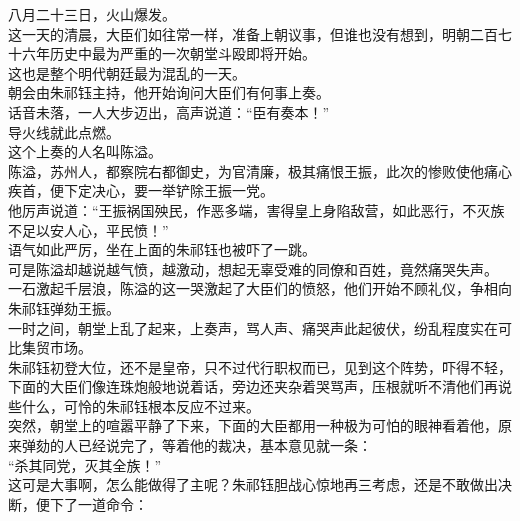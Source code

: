 \begin{multicols}{\theparacolNo}
八月二十三日，火山爆发。\\

这一天的清晨，大臣们如往常一样，准备上朝议事，但谁也没有想到，明朝二百七十六年历史中最为严重的一次朝堂斗殴即将开始。\\

这也是整个明代朝廷最为混乱的一天。\\

朝会由朱祁钰主持，他开始询问大臣们有何事上奏。\\

话音未落，一人大步迈出，高声说道：“臣有奏本！”\\

导火线就此点燃。\\

这个上奏的人名叫陈溢。\\

陈溢，苏州人，都察院右都御史，为官清廉，极其痛恨王振，此次的惨败使他痛心疾首，便下定决心，要一举铲除王振一党。\\

他厉声说道：“王振祸国殃民，作恶多端，害得皇上身陷敌营，如此恶行，不灭族不足以安人心，平民愤！”\\

语气如此严厉，坐在上面的朱祁钰也被吓了一跳。\\

可是陈溢却越说越气愤，越激动，想起无辜受难的同僚和百姓，竟然痛哭失声。\\

一石激起千层浪，陈溢的这一哭激起了大臣们的愤怒，他们开始不顾礼仪，争相向朱祁钰弹劾王振。\\

一时之间，朝堂上乱了起来，上奏声，骂人声、痛哭声此起彼伏，纷乱程度实在可比集贸市场。\\

朱祁钰初登大位，还不是皇帝，只不过代行职权而已，见到这个阵势，吓得不轻，下面的大臣们像连珠炮般地说着话，旁边还夹杂着哭骂声，压根就听不清他们再说些什么，可怜的朱祁钰根本反应不过来。\\

突然，朝堂上的喧嚣平静了下来，下面的大臣都用一种极为可怕的眼神看着他，原来弹劾的人已经说完了，等着他的裁决，基本意见就一条：\\

“杀其同党，灭其全族！”\\

这可是大事啊，怎么能做得了主呢？朱祁钰胆战心惊地再三考虑，还是不敢做出决断，便下了一道命令：\\


\end{multicols}
